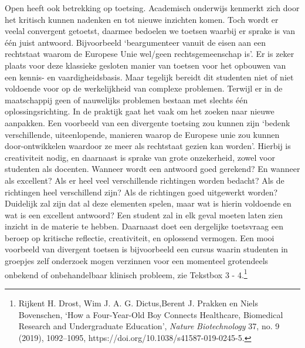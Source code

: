 \documentclass[smallauthor, chapterhaspagenum, nochapterinheader, pagenuminheader,  bigchapnum,medium2, tocpages,  garamond, titleinheader]{jote-book}
\begin{document}
	Open heeft ook betrekking op toetsing. Academisch onderwijs kenmerkt zich door het kritisch kunnen nadenken en tot nieuwe inzichten komen. Toch wordt er veelal convergent getoetst, daarmee bedoelen we toetsen waarbij er sprake is van één juist antwoord. Bijvoorbeeld ‘beargumenteer vanuit de eisen aan een rechtstaat waarom de Europese Unie wel/geen rechtsgemeenschap is'. Er is zeker plaats voor deze klassieke gesloten manier van toetsen voor het opbouwen van een kennis- en vaardigheidsbasis. Maar tegelijk bereidt dit studenten niet of niet voldoende voor op de werkelijkheid van complexe problemen. Terwijl er in de maatschappij geen of nauwelijks problemen bestaan met slechts één oplossingsrichting. In de praktijk gaat het vaak om het zoeken naar nieuwe aanpakken. Een voorbeeld van een divergente toetsing zou kunnen zijn ‘bedenk verschillende, uiteenlopende, manieren waarop de Europese unie zou kunnen door-ontwikkelen waardoor ze meer als rechtstaat gezien kan worden'. Hierbij is creativiteit nodig, en daarnaast is sprake van grote onzekerheid, zowel voor studenten als docenten. Wanneer wordt een antwoord goed gerekend? En wanneer als excellent? Als er heel veel verschillende richtingen worden bedacht? Als de richtingen heel verschillend zijn? Als de richtingen goed uitgewerkt worden? Duidelijk zal zijn dat al deze elementen spelen, maar wat is hierin voldoende en wat is een excellent antwoord? Een student zal in elk geval moeten laten zien inzicht in de materie te hebben. Daarnaast doet een dergelijke toetsvraag een beroep op kritische reflectie, creativiteit, en oplossend vermogen. Een mooi voorbeeld van divergent toetsen is bijvoorbeeld een cursus waarin studenten in groepjes zelf onderzoek mogen verzinnen voor een momenteel grotendeels onbekend of onbehandelbaar klinisch probleem, zie Tekstbox 3 - 4.\footnote{Rijkent H. Drost, Wim J. A. G. Dictus,Berent J. Prakken en Niels Bovenschen, ‘How a Four-Year-Old Boy Connects Healthcare, Biomedical Research and Undergraduate Education', \emph{Nature }\emph{Biotechnolog}\emph{y}\emph{ }37, no. 9 (2019), 1092--1095, https://doi.org/10.1038/s41587-019-0245-5.}
\end{document}
